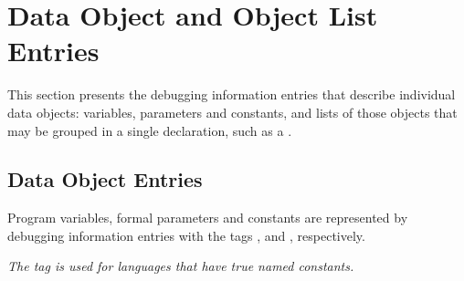 \chapter[Data Object and Object List]{Data Object and Object List Entries}
\label{chap:dataobjectandobjectlistentries}

This section presents the debugging information entries that
describe individual data objects: variables, parameters and
constants, and lists of those objects that may be grouped in
a single declaration, such as a
.

\section{Data Object Entries}
\label{chap:dataobjectentries}

Program variables,
formal parameters and constants are
represented by debugging information entries with the tags
\DWTAGvariableTARG{},
\DWTAGformalparameterTARG{} and
\DWTAGconstantTARG{},
respectively.

\textit{The tag \DWTAGconstant{} is used for languages that
have true named constants.}

